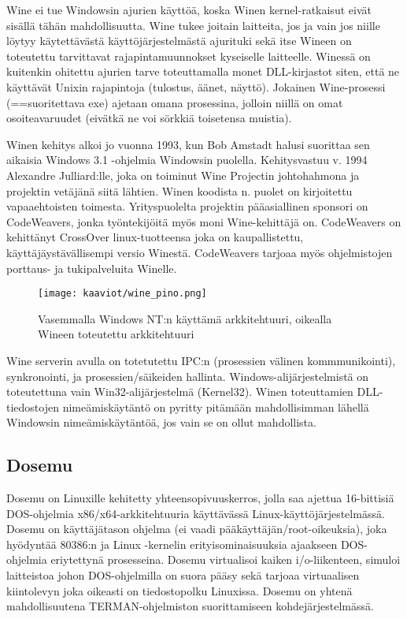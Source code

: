 Wine ei tue Windowsin ajurien käyttöä, koska Winen kernel-ratkaisut eivät sisällä tähän mahdollisuutta. Wine tukee joitain laitteita, jos ja vain jos niille löytyy käytettävästä käyttöjärjestelmästä ajurituki sekä itse Wineen on toteutettu tarvittavat rajapintamuunnokset kyseiselle laitteelle. Winessä on kuitenkin ohitettu ajurien tarve toteuttamalla monet DLL-kirjastot siten, että ne käyttävät Unixin rajapintoja (tulostus, äänet, näyttö). Jokainen Wine-prosessi (==suoritettava exe) ajetaan omana prosessina, jolloin niillä on omat osoiteavaruudet (eivätkä ne voi sörkkiä toisetensa muistia).

Winen kehitys alkoi jo vuonna 1993, kun Bob Amstadt halusi suorittaa sen aikaisia Windows 3.1 -ohjelmia Windowsin puolella. Kehitysvastuu v. 1994 Alexandre Julliard:lle, joka on toiminut Wine Projectin johtohahmona ja projektin vetäjänä siitä lähtien. Winen koodista n. puolet on kirjoitettu vapaaehtoisten toimesta. Yrityspuolelta projektin pääasiallinen sponsori on CodeWeavers, jonka työntekijöitä myös moni Wine-kehittäjä on. CodeWeavers on kehittänyt CrossOver linux-tuotteensa joka on kaupallistettu, käyttäjäystävällisempi versio Winestä. CodeWeavers tarjoaa myös ohjelmistojen porttaus- ja tukipalveluita Winelle.


\begin{figure}[H]
\centering
\texttt{[image: kaaviot/wine\_pino.png]}
\caption{Vasemmalla Windows NT:n käyttämä arkkitehtuuri, oikealla Wineen toteutettu arkkitehtuuri}
\end{figure}

Wine serverin avulla on totetutettu IPC:n (prosessien välinen kommmunikointi), synkronointi, ja prosessien/säikeiden hallinta. Windows-alijärjestelmistä on toteutettuna vain Win32-alijärjestelmä (Kernel32). Winen toteuttamien DLL-tiedostojen nimeämiskäytäntö on pyritty pitämään mahdollisimman lähellä Windowsin nimeämiskäytäntöä, jos vain se on ollut mahdollista. \cite{wine:architecture}

\subsection{Dosemu}

Dosemu on Linuxille kehitetty yhteensopivuuskerros, jolla saa ajettua 16-bittisiä DOS-ohjelmia x86/x64-arkkitehtuuria käyttävässä Linux-käyttöjärjestelmässä. Dosemu on käyttäjätason ohjelma (ei vaadi pääkäyttäjän/root-oikeuksia), joka hyödyntää 80386:n ja Linux -kernelin erityisominaisuuksia ajaakseen DOS-ohjelmia eriytettynä prosesseina. Dosemu virtualisoi kaiken i/o-liikenteen, simuloi laitteistoa johon DOS-ohjelmilla on suora pääsy sekä tarjoaa virtuaalisen kiintolevyn joka oikeasti on tiedostopolku Linuxissa. Dosemu on yhtenä mahdollisuutena TERMAN-ohjelmiston suorittamiseen kohdejärjestelmässä.

